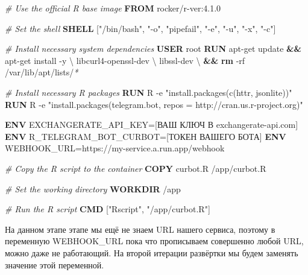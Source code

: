 \documentclass[
]{book}
\newenvironment{Shaded}{\begin{snugshade}}{\end{snugshade}}
\newcommand{\AttributeTok}[1]{\textcolor[rgb]{0.13,0.29,0.53}{#1}}
\newcommand{\CommentTok}[1]{\textcolor[rgb]{0.56,0.35,0.01}{\textit{#1}}}
\newcommand{\DataTypeTok}[1]{\textcolor[rgb]{0.13,0.29,0.53}{#1}}
\newcommand{\ExtensionTok}[1]{#1}
\newcommand{\FunctionTok}[1]{\textcolor[rgb]{0.13,0.29,0.53}{\textbf{#1}}}
\newcommand{\KeywordTok}[1]{\textcolor[rgb]{0.13,0.29,0.53}{\textbf{#1}}}
\newcommand{\NormalTok}[1]{#1}
\newcommand{\PreprocessorTok}[1]{\textcolor[rgb]{0.56,0.35,0.01}{\textit{#1}}}
\newcommand{\StringTok}[1]{\textcolor[rgb]{0.31,0.60,0.02}{#1}}
\begin{document}
\begin{Shaded}
\begin{Highlighting}[]
\CommentTok{\# Use the official R base image}
\KeywordTok{FROM}\NormalTok{ rocker/r{-}ver:4.1.0}

\CommentTok{\# Set the shell}
\KeywordTok{SHELL}\NormalTok{ [}\StringTok{"/bin/bash"}\NormalTok{, }\StringTok{"{-}o"}\NormalTok{, }\StringTok{"pipefail"}\NormalTok{, }\StringTok{"{-}e"}\NormalTok{, }\StringTok{"{-}u"}\NormalTok{, }\StringTok{"{-}x"}\NormalTok{, }\StringTok{"{-}c"}\NormalTok{]}

\CommentTok{\# Install necessary system dependencies}
\KeywordTok{USER}\NormalTok{ root}
\KeywordTok{RUN} \ExtensionTok{apt{-}get}\NormalTok{ update }\KeywordTok{\&\&} \ExtensionTok{apt{-}get}\NormalTok{ install }\AttributeTok{{-}y} \DataTypeTok{\textbackslash{}}
\NormalTok{    libcurl4{-}openssl{-}dev }\DataTypeTok{\textbackslash{}}
\NormalTok{    libssl{-}dev }\DataTypeTok{\textbackslash{}}
    \KeywordTok{\&\&} \FunctionTok{rm} \AttributeTok{{-}rf}\NormalTok{ /var/lib/apt/lists/}\PreprocessorTok{*}

\CommentTok{\# Install necessary R packages}
\KeywordTok{RUN} \ExtensionTok{R} \AttributeTok{{-}e} \StringTok{"install.packages(c(\textquotesingle{}httr\textquotesingle{}, \textquotesingle{}jsonlite\textquotesingle{}))"}
\KeywordTok{RUN} \ExtensionTok{R} \AttributeTok{{-}e} \StringTok{"install.packages(\textquotesingle{}telegram.bot\textquotesingle{}, repos = \textquotesingle{}http://cran.us.r{-}project.org\textquotesingle{})"}

\KeywordTok{ENV}\NormalTok{ EXCHANGERATE\_API\_KEY=[ВАШ КЛЮЧ В exchangerate{-}api.com]}
\KeywordTok{ENV}\NormalTok{ R\_TELEGRAM\_BOT\_CURBOT=[ТОКЕН ВАШЕГО БОТА]}
\KeywordTok{ENV}\NormalTok{ WEBHOOK\_URL=https://my{-}service.a.run.app/webhook}

\CommentTok{\# Copy the R script to the container}
\KeywordTok{COPY}\NormalTok{ curbot.R /app/curbot.R}

\CommentTok{\# Set the working directory}
\KeywordTok{WORKDIR}\NormalTok{ /app}

\CommentTok{\# Run the R script}
\KeywordTok{CMD}\NormalTok{ [}\StringTok{"Rscript"}\NormalTok{, }\StringTok{"/app/curbot.R"}\NormalTok{]}
\end{Highlighting}
\end{Shaded}

На данном этапе этапе мы ещё не знаем URL нашего сервиса, поэтому в переменную WEBHOOK\_URL пока что прописываем совершенно любой URL, можно даже не работающий. На второй итерации развёртки мы будем заменять значение этой переменной.
\end{document}
